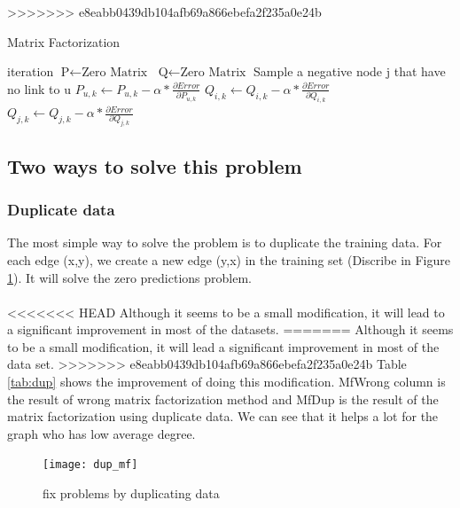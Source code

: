 \documentclass[12pt]{article}
\begin{document}
>>>>>>> e8eabb0439db104afb69a866ebefa2f235a0e24b
\begin{algorithm}
	\caption{Matrix Factorization}
	\begin{algorithmic}
		 {iteration}
			\State $\text{P} \gets \text{Zero Matrix}$
			\State $\text{Q} \gets \text{Zero Matrix}$
					\State Sample a negative node j that have no link to u
						\State $P_{u,k} \gets P_{u,k} - \alpha *  \frac{\partial Error}{\partial P_{u,k}}$
						\State $Q_{i,k} \gets Q_{i,k} - \alpha *  \frac{\partial Error}{\partial Q_{i,k}}$
						\State $Q_{j,k} \gets Q_{j,k} - \alpha *  \frac{\partial Error}{\partial Q_{j,k}}$
					\EndFor
				\EndFor
			\EndFor
		\EndProcedure
	\end{algorithmic}
	\label{alg:mf}
\end{algorithm}


\subsection{Two ways to solve this problem}

\subsubsection{Duplicate data}
The most simple way to solve the problem is to duplicate the training data. For each edge (x,y), we create a new edge (y,x) in the training set (Discribe in Figure \ref{fig:dup_mf}). It will solve the zero predictions problem. 
\\ \\
<<<<<<< HEAD
Although it seems to be a small modification, it will lead to a significant improvement in most of the datasets.
=======
Although it seems to be a small modification, it will lead a significant improvement in most of the data set.
>>>>>>> e8eabb0439db104afb69a866ebefa2f235a0e24b
Table \ref{tab:dup} shows the improvement of doing this modification. MfWrong column is the result of wrong matrix factorization method and MfDup is the result of the matrix factorization using duplicate data. We can see that it helps a lot for the graph who has low average degree. 


\begin{figure}[h]
	\centering
	\texttt{[image: dup\_mf]}
	\caption{fix problems by duplicating data}
	\label{fig:dup_mf}
\end{figure}
\end{document}
